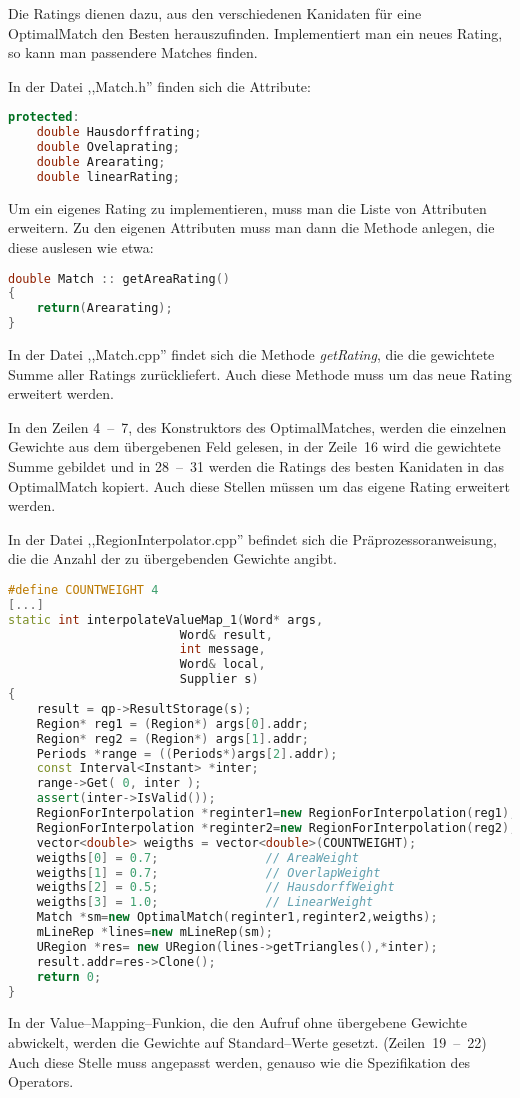 Die Ratings dienen dazu, aus den verschiedenen Kanidaten für eine OptimalMatch den Besten herauszufinden. Implementiert man ein neues Rating, so kann man passendere Matches finden. 

In der Datei ,,Match.h'' finden sich die Attribute:
\begin{lstlisting}[language=c++]
protected:
	double Hausdorffrating;
	double Ovelaprating;
	double Arearating;
	double linearRating;
 \end{lstlisting}
Um ein eigenes Rating zu implementieren, muss man die Liste von Attributen erweitern. Zu den eigenen  Attributen muss man dann die Methode anlegen, die diese auslesen wie etwa:
\begin{lstlisting}[language=c++]
double Match :: getAreaRating()
{
    return(Arearating);
}
\end{lstlisting}

In der Datei ,,Match.cpp'' findet sich die Methode \textit{getRating}, die die gewichtete Summe aller Ratings zurückliefert. Auch diese Methode muss um das neue Rating erweitert werden.

In den Zeilen 4~--~7, des Konstruktors des OptimalMatches,  werden die einzelnen Gewichte aus dem übergebenen Feld gelesen, in  der Zeile~16 wird die gewichtete Summe gebildet und  in  28~--~31 werden die Ratings des besten Kanidaten in das OptimalMatch kopiert. Auch  diese Stellen müssen um das eigene Rating erweitert werden.

In der Datei ,,RegionInterpolator.cpp'' befindet sich die Präprozessoranweisung, die die Anzahl der zu übergebenden Gewichte angibt.
\begin{lstlisting}[language=c++]
#define COUNTWEIGHT 4
[...]
static int interpolateValueMap_1(Word* args,
                        Word& result,
                        int message,
                        Word& local,
                        Supplier s) 
{                         
    result = qp->ResultStorage(s);
    Region* reg1 = (Region*) args[0].addr;
    Region* reg2 = (Region*) args[1].addr;
    Periods *range = ((Periods*)args[2].addr);
    const Interval<Instant> *inter;    
    range->Get( 0, inter );
    assert(inter->IsValid());
    RegionForInterpolation *reginter1=new RegionForInterpolation(reg1);
    RegionForInterpolation *reginter2=new RegionForInterpolation(reg2);
    vector<double> weigths = vector<double>(COUNTWEIGHT);
    weigths[0] = 0.7; 				// AreaWeight
    weigths[1] = 0.7;				// OverlapWeight
    weigths[2] = 0.5;				// HausdorffWeight
    weigths[3] = 1.0;				// LinearWeight
    Match *sm=new OptimalMatch(reginter1,reginter2,weigths);
    mLineRep *lines=new mLineRep(sm);    
    URegion *res= new URegion(lines->getTriangles(),*inter);
    result.addr=res->Clone();       
    return 0;
}
\end{lstlisting}
In der Value--Mapping--Funkion, die den Aufruf ohne übergebene Gewichte abwickelt, werden die Gewichte auf Standard--Werte gesetzt. (Zeilen~19~--~22) Auch diese Stelle muss angepasst werden, genauso wie die Spezifikation des Operators. 

